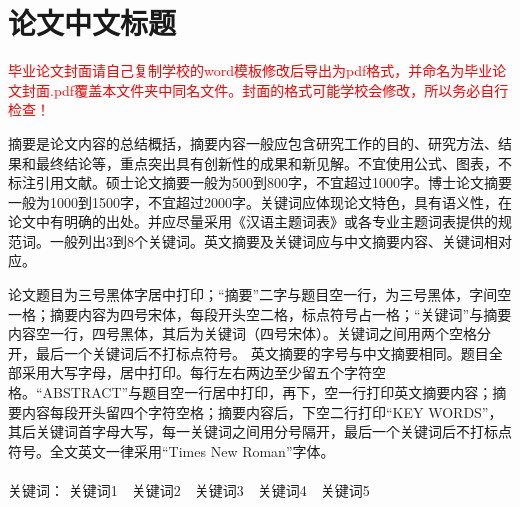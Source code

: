 \documentclass[UTF8,12pt,AutoFakeBold]{ctexart}
\begin{document}
	\setcounter{page}{1} %
	
	
	
	\setcounter{page}{1} %
	\pagestyle{fancy}%
	\fancyhf{}
	\fancyfoot[C]{\thepage} %
	
	
	\section*{论文中文标题}
	\begin{cnabstract}
		\fontsize{14pt}{17.5pt}\selectfont%
		\textcolor{red}{毕业论文封面请自己复制学校的word模板修改后导出为pdf格式，并命名为毕业论文封面.pdf覆盖本文件夹中同名文件。封面的格式可能学校会修改，所以务必自行检查！}
		\par
		摘要是论文内容的总结概括，摘要内容一般应包含研究工作的目的、研究方法、结果和最终结论等，重点突出具有创新性的成果和新见解。不宜使用公式、图表，不标注引用文献。硕士论文摘要一般为500到800字，不宜超过1000字。博士论文摘要一般为1000到1500字，不宜超过2000字。关键词应体现论文特色，具有语义性，在论文中有明确的出处。并应尽量采用《汉语主题词表》或各专业主题词表提供的规范词。一般列出3到8个关键词。英文摘要及关键词应与中文摘要内容、关键词相对应。
		\par
		论文题目为三号黑体字居中打印；“摘要”二字与题目空一行，为三号黑体，字间空一格；摘要内容为四号宋体，每段开头空二格，标点符号占一格；“关键词”与摘要内容空一行，四号黑体，其后为关键词（四号宋体）。关键词之间用两个空格分开，最后一个关键词后不打标点符号。
		英文摘要的字号与中文摘要相同。题目全部采用大写字母，居中打印。每行左右两边至少留五个字符空格。“ABSTRACT”与题目空一行居中打印，再下，空一行打印英文摘要内容；摘要内容每段开头留四个字符空格；摘要内容后，下空二行打印“KEY WORDS”，其后关键词首字母大写，每一关键词之间用分号隔开，最后一个关键词后不打标点符号。全文英文一律采用“Times New Roman”字体。
		\\
		\\
		\heiti 关键词：
		\songti 关键词1\ \ 关键词2\ \ 关键词3\ \ 关键词4\ \ 关键词5
	\end{cnabstract}
	\pagebreak
\end{document}
